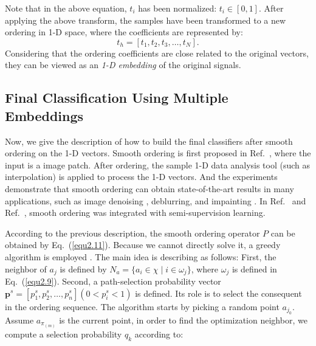 \documentclass{ws-ijwmip}
\begin{document}
%

Note that in the above equation, $t_i$ has been normalized: $t_i\in [0, 1]$. 
After applying the above transform, the samples have been transformed to a new ordering in 1-D space, where the coefficients are represented by:
\begin{equation}
t_h = [t_1,t_2,t_3,\dots,t_N].
 \label{equ2.16}
\end{equation}
Considering that the ordering coefficients are close related to the original vectors, they can be viewed as an \emph{1-D embedding} of the original signals.


\subsection{Final Classification Using Multiple Embeddings}
Now, we give the description of how to build the final classifiers after smooth ordering on the 1-D vectors. 
Smooth ordering is first proposed in Ref.~, 
where the input is a image patch.
After ordering, the sample 1-D data analysis tool (such as interpolation) is applied to process the 1-D vectors. 
And the experiments demonstrate that smooth ordering can obtain state-of-the-art results in many applications, such as image denoising \cite{32,33}, deblurring, and impainting \cite{30}. In Ref.~ and Ref.~, smooth ordering was integrated with semi-supervision learning.

According to the previous description, the smooth ordering operator $P$ can be obtained by Eq.~(\ref{equ2.11}). 
Because we cannot directly solve it, a greedy algorithm is employed \cite{39}. The main idea is describing as follows: First, the neighbor of $a_j$ is defined by $N_a = \{a_i \in \chi \mid i \in \omega _j\}$, where $\omega_j$ is defined in Eq.~(\ref{equ2.9}). Second, a path-selection probability vector $\pmb p^s = [p_1^s,p_2^s,\dots,p_n^s] (0<p_i^s<1)$ is defined.
Its role is to select the consequent in the ordering sequence. 
The algorithm starts by picking a random point $a_{j_0}$. Assume $a_{\pi_(m)}$ is the current point, in order to find the optimization neighbor, we compute a selection probability $q_k$ according to:
\end{document}
